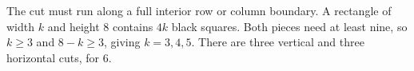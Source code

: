 The cut must run along a full interior row or column boundary. A rectangle of width $k$ and height $8$ contains $4k$ black squares. Both pieces need at least nine, so $k\ge3$ and $8-k\ge3$, giving $k=3,4,5$. There are three vertical and three horizontal cuts, for $\boxed6$.
